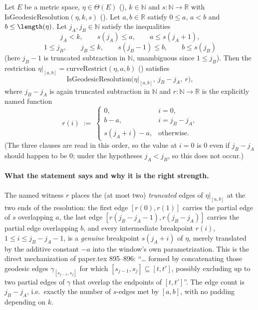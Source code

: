 \begin{lemma}
  Let $E$ be a metric space, $\eta \in \Theta(E)$ (), $k \in \mathbb{N}$ and $s
  \colon \mathbb{N} \to \mathbb{R}$ with $\mathrm{IsGeodesicResolution}(\eta,k,s)$
  (). Let $a,b \in \mathbb{R}$ satisfy $0 \le a$, $a < b$ and $b \le
  \length(\eta)$. Let $j_A, j_B \in \mathbb{N}$ satisfy the inequalities
  \[
    j_A < k,\qquad s(j_A) \le a,\qquad a \le s(j_A+1),
  \]
  \[
    1 \le j_B,\qquad j_B \le k,\qquad s(j_B-1) \le b,\qquad b \le s(j_B)
  \]
  (here $j_B-1$ is truncated subtraction in $\mathbb{N}$, unambiguous since $1 \le j_B$). Then the
  restriction $\eta|_{[a,b]} = \mathrm{curveRestrict}(\eta,a,b)$ () satisfies
  \[
    \mathrm{IsGeodesicResolution}\bigl(\eta|_{[a,b]},\ j_B-j_A,\ r\bigr),
  \]
  where $j_B-j_A$ is again truncated subtraction in $\mathbb{N}$ and $r \colon \mathbb{N} \to
  \mathbb{R}$ is the explicitly named function
  \[
    r(i) \;:=\;
    \begin{cases}
      0, & i = 0,\\
      b-a, & i = j_B-j_A,\\
      s(j_A+i)-a, & \text{otherwise.}
    \end{cases}
  \]
  (The three clauses are read in this order, so the value at $i=0$ is $0$ even if $j_B-j_A$ should
  happen to be $0$; under the hypotheses $j_A < j_B$, so this does not occur.)

  \paragraph{What the statement says and why it is the right strength.} The named witness $r$
  places the (at most two) \emph{truncated} edges of $\eta|_{[a,b]}$ at the two ends of the
  resolution: the first edge $[r(0),r(1)]$ carries the partial edge of $s$ overlapping $a$, the
  last edge $[r(j_B-j_A-1),r(j_B-j_A)]$ carries the partial edge overlapping $b$, and every
  intermediate breakpoint $r(i)$, $1 \le i \le j_B-j_A-1$, is a \emph{genuine} breakpoint
  $s(j_A+i)$ of $\eta$, merely translated by the additive constant $-a$ into the window's own
  parametrization. This is the direct mechanization of paper.tex 895--896: ``\dots{} formed by
  concatenating those geodesic edges $\gamma_{[s_{j-1},s_j]}$ for which $[s_{j-1},s_j] \subseteq
  [t,t']$, possibly excluding up to two partial edges of $\gamma$ that overlap the endpoints of
  $[t,t']$''. The edge count is $j_B-j_A$, i.e.\ exactly the number of $s$-edges met by $[a,b]$,
  with no padding depending on $k$.


\end{lemma}
